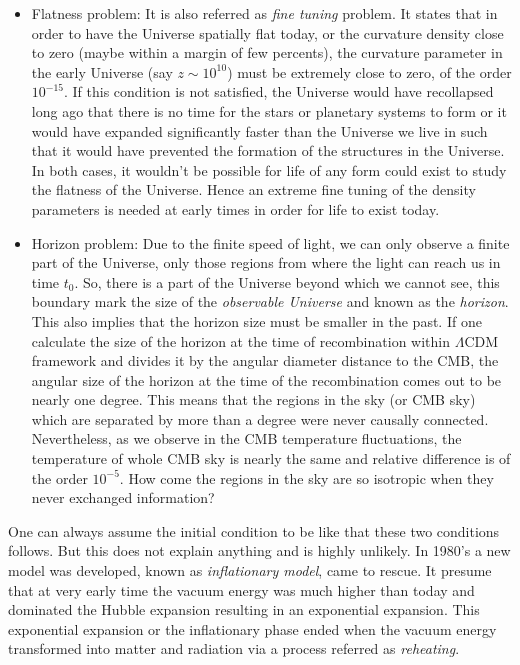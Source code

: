 \begin{itemize}
	\item Flatness problem: It is also referred as {\it fine tuning} problem. It 
				states that in order to have the Universe spatially flat today, or
				the curvature density close  to zero (maybe within a margin of
				few percents), the curvature parameter in the early Universe (say 
				$z\sim10^{10}$) must be extremely close to zero, of the order $10^{-15}$.
				If this condition is not satisfied, the Universe would have recollapsed
				long ago that there is no time for the stars or planetary systems to form
				or it would have expanded significantly faster than the Universe
				we live in such that it would have prevented the formation of the structures
				in the Universe. In both cases, it wouldn't be possible for life
				of any form could exist to study the flatness of the Universe. Hence
				an extreme fine tuning of the density parameters is needed at early
				times in order for life to exist today.

	\item Horizon problem: Due to the finite speed of light, we can only observe
				a finite part of the Universe, 
				only those regions from where the light can reach us
				in time $t_0$. So, there is a part of the Universe beyond which
				we cannot see, this boundary mark the size of the {\it observable Universe}
				and known as the {\it horizon}. This also implies that the horizon
				size must be smaller in the past. If one calculate the size of the
				horizon at the time of recombination within $\Lambda$CDM framework and
				divides it by the angular diameter distance to the CMB, the angular
				size of the horizon at the time of the recombination 
				comes out to be nearly one degree. This means
				that the regions in the sky (or CMB sky) which are separated by 
				more than a degree were never causally connected. Nevertheless, as
				we observe in the CMB temperature fluctuations, the temperature of
				whole CMB sky is nearly the same and relative difference is of the 
				order $10^{-5}$. How come the regions in the sky are so isotropic
				when they never exchanged information?
\end{itemize}

One can always assume the initial condition to be like that these two conditions
follows. But this does not explain anything and is highly unlikely. In 1980's 
a new model was developed, known as {\it inflationary model}, came to rescue. It presume
that at very early time the vacuum energy was much higher than today and dominated
the Hubble expansion resulting in an exponential expansion. This exponential
expansion or the inflationary phase ended when the vacuum energy transformed into
matter and radiation via a process referred as {\it reheating}.

